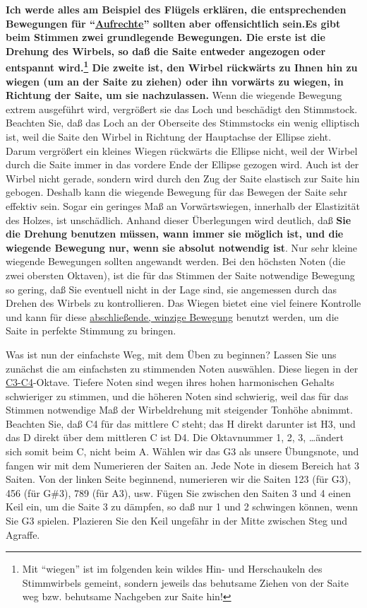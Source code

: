 {\normalsize \textbf{Ich werde alles am Beispiel des Flügels erklären, die entsprechenden Bewegungen für \enquote{\hyperlink{upright}{Aufrechte}} sollten aber offensichtlich sein.}}\textbf{Es gibt beim Stimmen zwei grundlegende Bewegungen.
 Die erste ist die Drehung des Wirbels, so daß die Saite entweder angezogen oder entspannt wird.\footnote{Mit \enquote{wiegen} ist im folgenden kein wildes Hin- und Herschaukeln des Stimmwirbels gemeint, sondern jeweils das behutsame Ziehen von der Saite weg bzw. behutsame Nachgeben zur Saite hin!}
 Die zweite ist, den Wirbel rückwärts zu Ihnen hin zu wiegen (um an der Saite zu ziehen) oder ihn vorwärts zu wiegen, in Richtung der Saite, um sie nachzulassen.}
 Wenn die wiegende Bewegung extrem ausgeführt wird, vergrößert sie das Loch und beschädigt den Stimmstock.
 Beachten Sie, daß das Loch an der Oberseite des Stimmstocks ein wenig elliptisch ist, weil die Saite den Wirbel in Richtung der Hauptachse der Ellipse zieht.
 Darum vergrößert ein kleines Wiegen rückwärts die Ellipse nicht, weil der Wirbel durch die Saite immer in das vordere Ende der Ellipse gezogen wird.
 Auch ist der Wirbel nicht gerade, sondern wird durch den Zug der Saite elastisch zur Saite hin gebogen.
 Deshalb kann die wiegende Bewegung für das Bewegen der Saite sehr effektiv sein.
 Sogar ein geringes Maß an Vorwärtswiegen, innerhalb der Elastizität des Holzes, ist unschädlich.
 Anhand dieser Überlegungen wird deutlich, daß \textbf{Sie die Drehung benutzen müssen, wann immer sie möglich ist, und die wiegende Bewegung nur, wenn sie absolut notwendig ist}.
 Nur sehr kleine wiegende Bewegungen sollten angewandt werden.
 Bei den höchsten Noten (die zwei obersten Oktaven), ist die für das Stimmen der Saite notwendige Bewegung so gering, daß Sie eventuell nicht in der Lage sind, sie angemessen durch das Drehen des Wirbels zu kontrollieren.
 Das Wiegen bietet eine viel feinere Kontrolle und kann für diese \hyperlink{c2_5_infi}{abschließende, winzige Bewegung} benutzt werden, um die Saite in perfekte Stimmung zu bringen.
 

Was ist nun der einfachste Weg, mit dem Üben zu beginnen?
 Lassen Sie uns zunächst die am einfachsten zu stimmenden Noten auswählen.
 Diese liegen in der \hyperlink{Noten}{C3-C4}-Oktave.
 Tiefere Noten sind wegen ihres hohen harmonischen Gehalts schwieriger zu stimmen, und die höheren Noten sind schwierig, weil das für das Stimmen notwendige Maß der Wirbeldrehung mit steigender Tonhöhe abnimmt.
 Beachten Sie, daß C4 für das mittlere C steht; das H direkt darunter ist H3, und das D direkt über dem mittleren C ist D4.
 Die Oktavnummer 1, 2, 3, \ldots ändert sich somit beim C, nicht beim A.
 Wählen wir das G3 als unsere Übungsnote, und fangen wir mit dem Numerieren der Saiten an.
 Jede Note in diesem Bereich hat 3 Saiten.
 Von der linken Seite beginnend, numerieren wir die Saiten 123 (für G3), 456 (für G\#3), 789 (für A3), usw.
 Fügen Sie zwischen den Saiten 3 und 4 einen Keil ein, um die Saite 3 zu dämpfen, so daß nur 1 und 2 schwingen können, wenn Sie G3 spielen.
 Plazieren Sie den Keil ungefähr in der Mitte zwischen Steg und Agraffe.
 

